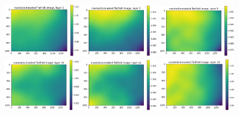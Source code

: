\documentclass[letterpaper,11pt]{article}
\begin{document}
\begin{figure}[!ht]
\centering
\includegraphics[width=0.3\textwidth]{images/results/masked_over_unmasked_flatfield_image_layers_vectra/masked_over_unmasked_flatfield_image_layer_1}
\includegraphics[width=0.3\textwidth]{images/results/masked_over_unmasked_flatfield_image_layers_vectra/masked_over_unmasked_flatfield_image_layer_5}
\includegraphics[width=0.3\textwidth]{images/results/masked_over_unmasked_flatfield_image_layers_vectra/masked_over_unmasked_flatfield_image_layer_9}
\includegraphics[width=0.3\textwidth]{images/results/masked_over_unmasked_flatfield_image_layers_vectra/masked_over_unmasked_flatfield_image_layer_10}
\includegraphics[width=0.3\textwidth]{images/results/masked_over_unmasked_flatfield_image_layers_vectra/masked_over_unmasked_flatfield_image_layer_14}
\includegraphics[width=0.3\textwidth]{images/results/masked_over_unmasked_flatfield_image_layers_vectra/masked_over_unmasked_flatfield_image_layer_18}

\end{figure}
\end{document}
